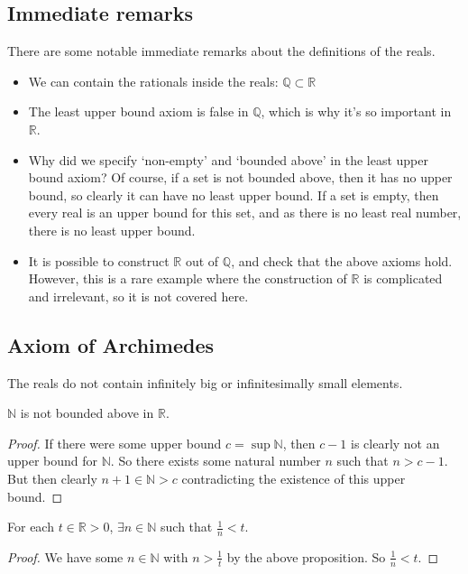 \subsection{Immediate remarks}
There are some notable immediate remarks about the definitions of the reals.
\begin{itemize}
	\item We can contain the rationals inside the reals: \(\mathbb Q \subset \mathbb R\)
	\item The least upper bound axiom is false in \(\mathbb Q\), which is why it's so important in \(\mathbb R\).
	\item Why did we specify `non-empty' and `bounded above' in the least upper bound axiom?
	      Of course, if a set is not bounded above, then it has no upper bound, so clearly it can have no least upper bound.
	      If a set is empty, then every real is an upper bound for this set, and as there is no least real number, there is no least upper bound.
	\item It is possible to construct \(\mathbb R\) out of \(\mathbb Q\), and check that the above axioms hold.
	      However, this is a rare example where the construction of \(\mathbb R\) is complicated and irrelevant, so it is not covered here.
\end{itemize}

\subsection{Axiom of Archimedes}
The reals do not contain infinitely big or infinitesimally small elements.
\begin{proposition}
	\(\mathbb N\) is not bounded above in \(\mathbb R\).
\end{proposition}
\begin{proof}
	If there were some upper bound \(c = \sup \mathbb N\), then \(c-1\) is clearly not an upper bound for \(\mathbb N\).
	So there exists some natural number \(n\) such that \(n > c-1\).
	But then clearly \(n+1 \in \mathbb N > c\) contradicting the existence of this upper bound.
\end{proof}
\begin{corollary}
	For each \(t \in \mathbb R > 0\), \(\exists n \in \mathbb N\) such that \(\frac{1}{n} < t\).
\end{corollary}
\begin{proof}
	We have some \(n \in \mathbb N\) with \(n > \frac{1}{t}\) by the above proposition.
	So \(\frac{1}{n} < t\).
\end{proof}

